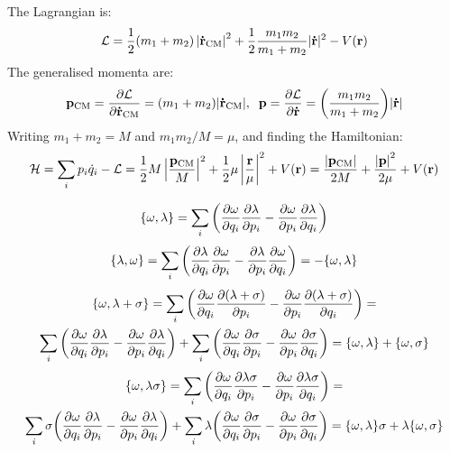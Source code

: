 \documentclass{report}
\theoremstyle{definition}
\begin{document}
\begin{chapter2}\label{prob: 8}
	The Lagrangian is:
		\begin{gather*}
			\mathcal{L} = \frac{1}{2}(m_1 + m_2)\left|{\bf \dot r_{\mathrm{CM}}}\right|^2 + \frac{1}{2}\frac{m_1 m_2}{m_1 + m_2}|{\bf \dot r}|^2 - V({\bf r})
		\end{gather*}
		The generalised momenta are:
		\begin{gather*}
			{\bf p_{\mathrm{CM}}} = \pdv{\mathcal{L}}{\bf \dot r_{\mathrm{CM}}} = (m_1 + m_2)|{\bf \dot r_{\mathrm{CM}}}|, \;\; {\bf p} = \pdv{\mathcal{L}}{\bf \dot r} = \pqty{\frac{m_1 m_2}{m_1 + m_2}}|{\bf \dot r}|
		\end{gather*}
		Writing $m_1 + m_2 = M$ and $m_1 m_2/M  = \mu$, and finding the Hamiltonian:
		\begin{gather*}
			\mathcal{H} = \sum_i p_i \dot{q}_i - \mathcal{L} = \frac{1}{2}M\left|\frac{{\bf p_{\mathrm{CM}}}}{M}\right|^2 + \frac{1}{2}\mu\left|\frac{{\bf r}}{\mu}\right|^2 + V({\bf r}) = \frac{\left|{\bf p_{\mathrm{CM}}}\right|}{2M} + \frac{\left|{\bf p}\right|^2}{2\mu} + V(\bf r) 
		\end{gather*}
\end{chapter2}

\begin{chapter2}\label{prob: 9}
	\begin{gather*}
			\acomm{\omega}{\lambda} = \sum_i \pqty{\pdv{\omega}{q_i}\pdv{\lambda}{p_i} - \pdv{\omega}{p_i}\pdv{\lambda}{q_i}}
		\end{gather*}
		\begin{gather*}
			\acomm{\lambda}{\omega} = \sum_i \pqty{\pdv{\lambda}{q_i}\pdv{\omega}{p_i} - \pdv{\lambda}{p_i}\pdv{\omega}{q_i} } = -\acomm{\omega}{\lambda}
		\end{gather*}
		\center{\rule{12cm}{0.4pt}}
		\begin{gather*}
			\acomm{\omega}{\lambda + \sigma} = \sum_i \pqty{\pdv{\omega}{q_i}\pdv{(\lambda + \sigma)}{p_i} - \pdv{\omega}{p_i}\pdv{(\lambda + \sigma)}{q_i}} = \\
			\sum_i \pqty{\pdv{\omega}{q_i} \pdv{\lambda}{p_i} - \pdv{\omega}{p_i}\pdv{\lambda}{q_i}} + \sum_i \pqty{\pdv{\omega}{q_i} \pdv{\sigma}{p_i} - \pdv{\omega}{p_i}\pdv{\sigma}{q_i}} = \acomm{\omega}{\lambda} + \acomm{\omega}{\sigma}
		\end{gather*}
		\center{\rule{12cm}{0.4pt}}
		\begin{gather*}
			\acomm{\omega}{\lambda\sigma} = \sum_i \pqty{\pdv{\omega}{q_i} \pdv{\lambda\sigma}{p_i} - \pdv{\omega}{p_i}\pdv{\lambda\sigma}{q_i}} = \\
			\sum_i \sigma\pqty{\pdv{\omega}{q_i} \pdv{\lambda}{p_i} - \pdv{\omega}{p_i}\pdv{\lambda}{q_i}} + \sum_i \lambda\pqty{\pdv{\omega}{q_i} \pdv{\sigma}{p_i} - \pdv{\omega}{p_i}\pdv{\sigma}{q_i}} = \acomm{\omega}{\lambda}\sigma + \lambda\acomm{\omega}{\sigma}
		\end{gather*}

\end{chapter2}
\end{document}

